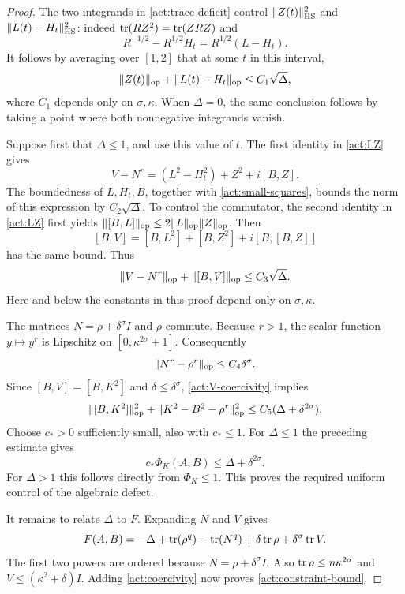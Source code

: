 \begin{proof}
The two integrands in \eqref{act:trace-deficit} control
$\|Z(t)\|_{\mathrm{HS}}^2$ and $\|L(t)-H_t\|_{\mathrm{HS}}^2$:
indeed $\operatorname{tr}(RZ^2)=\operatorname{tr}(ZRZ)$ and
\[
 R^{-1/2}-R^{1/2}H_t=R^{1/2}(L-H_t).
\]
It follows by averaging over $[1,2]$ that at some $t$ in this
interval,
\begin{equation}\label{act:small-squares}
 \|Z(t)\|_{\operatorname{op}}+\|L(t)-H_t\|_{\operatorname{op}}
        \leq C_1\sqrt\Delta,
\end{equation}
where $C_1$ depends only on $\sigma,\kappa$.
When $\Delta=0$, the same conclusion follows by taking a point
where both nonnegative integrands vanish.

Suppose first that $\Delta\leq1$, and use this value of $t$.
The first identity in \eqref{act:LZ} gives
\[
 V-N^r=(L^2-H_t^2)+Z^2+i[B,Z].
\]
The boundedness of $L,H_t,B$, together with
\eqref{act:small-squares}, bounds the norm of this expression by
$C_2\sqrt\Delta$.  To control the commutator, the second identity
in \eqref{act:LZ} first yields
$\|[B,L]\|_{\operatorname{op}}\leq2\|L\|_{\operatorname{op}}\|Z\|_{\operatorname{op}}$.
Then
\[
 [B,V]=[B,L^2]+[B,Z^2]+i[B,[B,Z]]
\]
has the same bound.  Thus
\begin{equation}\label{act:V-coercivity}
 \|V-N^r\|_{\operatorname{op}}+\|[B,V]\|_{\operatorname{op}}
       \leq C_3\sqrt\Delta.
\end{equation}
Here and below the constants in this proof depend only on
$\sigma,\kappa$.

The matrices $N=\rho+\delta^\sigma I$ and $\rho$ commute.
Because $r>1$, the scalar function $y\mapsto y^r$ is Lipschitz on
$[0,\kappa^{2\sigma}+1]$.  Consequently
\[
 \|N^r-\rho^r\|_{\operatorname{op}}\leq C_4\delta^\sigma.
\]
Since $[B,V]=[B,K^2]$ and $\delta\leq\delta^\sigma$,
\eqref{act:V-coercivity} implies
\[
 \|[B,K^2]\|_{\operatorname{op}}^2
   +\|K^2-B^2-\rho^r\|_{\operatorname{op}}^2
       \leq C_5(\Delta+\delta^{2\sigma}).
\]
Choose $c_*>0$ sufficiently small, also with $c_*\leq1$.
For $\Delta\leq1$ the preceding estimate gives
\begin{equation}\label{act:coercivity}
                   c_*\Phi_K(A,B)\leq\Delta+\delta^{2\sigma}.
\end{equation}
For $\Delta>1$ this follows directly from $\Phi_K\leq1$.
This proves the required uniform control of the algebraic defect.

It remains to relate $\Delta$ to $F$.  Expanding $N$ and $V$ gives
\[
 F(A,B)=-\Delta+\operatorname{tr}(\rho^q)-\operatorname{tr}(N^q)
                  +\delta\operatorname{tr}\rho+\delta^\sigma\operatorname{tr} V.
\]
The first two powers are ordered because $N=\rho+\delta^\sigma I$.
Also $\operatorname{tr}\rho\leq n\kappa^{2\sigma}$ and
$V\leq(\kappa^2+\delta)I$.  Adding \eqref{act:coercivity} now
proves \eqref{act:constraint-bound}.
\end{proof}

